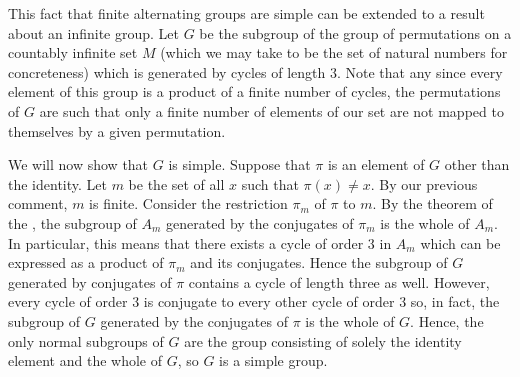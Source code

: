 \documentclass[12pt]{article}
\begin{document}
This fact that finite alternating groups are simple can be extended to a result about an infinite group.  Let $G$ be the subgroup of the group of permutations on a countably infinite set $M$ (which we may take to be the set of natural numbers for concreteness) which is generated by cycles of length $3$.  Note that any since every element of this group is a product of a finite number of cycles, the permutations of $G$ are such that only a finite number of elements of our set are not mapped to themselves by a given permutation.

We will now show that $G$ is simple.  Suppose that $\pi$ is an element of $G$ other than the identity.  Let $m$ be the set of all $x$ such that $\pi (x) \neq x$.  By our previous comment, $m$ is finite.  Consider the restriction $\pi_m$ of $\pi$ to $m$.  By the theorem of the , the subgroup of $A_m$ generated by the conjugates of $\pi_m$ is the whole of $A_m$.  In particular, this means that there exists a cycle of order $3$ in $A_m$ which can be expressed as a product of $\pi_m$ and its conjugates.  Hence the subgroup of $G$ generated by conjugates of $\pi$ contains a cycle of length three as well.  However, every cycle of order $3$ is conjugate to every other cycle of order $3$ so, in fact, the subgroup of $G$ generated by the conjugates of $\pi$ is the whole of $G$.  Hence, the only normal subgroups of $G$ are the group consisting of solely the identity element and the whole of $G$, so $G$ is a simple group.
\end{document}
